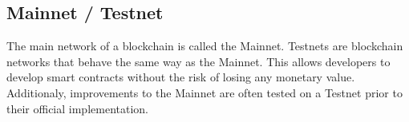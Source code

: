 \subsection{Mainnet / Testnet}
The main network of a blockchain is called the Mainnet. Testnets are blockchain networks that behave the same way as the Mainnet. This allows developers to develop smart contracts without the risk of losing any monetary value. Additionaly, improvements to the Mainnet are often tested on a Testnet prior to their official implementation.